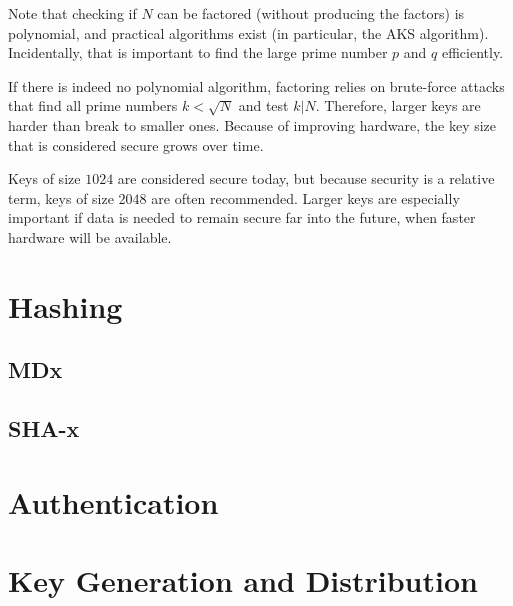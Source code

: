 Note that checking if $N$ can be factored (without producing the factors) is polynomial, and practical algorithms exist (in particular, the AKS algorithm).
Incidentally, that is important to find the large prime number $p$ and $q$ efficiently.
\medskip

If there is indeed no polynomial algorithm, factoring relies on brute-force attacks that find all prime numbers $k<\sqrt{N}$ and test $k|N$.
Therefore, larger keys are harder than break to smaller ones.
Because of improving hardware, the key size that is considered secure grows over time.

Keys of size $1024$ are considered secure today, but because security is a relative term, keys of size $2048$ are often recommended. 
Larger keys are especially important if data is needed to remain secure far into the future, when faster hardware will be available.

\section{Hashing}\label{sec:sd:crypto:hash}

\subsection{MDx}

\subsection{SHA-x}

\section{Authentication}\label{sec:sd:crypto:auth}

\section{Key Generation and Distribution}

